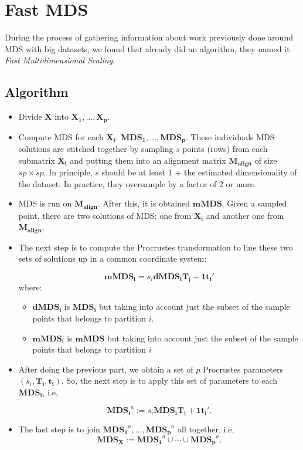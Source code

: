 \documentclass[11pt]{report}
\begin{document}
\section{Fast MDS}
During the process of gathering information about work previously done around
MDS with big datasets, we found that  already did an 
algorithm, they named it \textit{Fast Multidimensional Scaling}. 


\subsection{Algorithm}

\begin{itemize}

\item Divide \textbf{X} into $\mathbf{X_1},\dots, \mathbf{X_p}$.

\item Compute MDS for each $\mathbf{X_i}$: 
$\mathbf{MDS_1}, \dots, \mathbf{MDS_p}$. These individuals MDS solutions are 
stitched together by sampling $s$ points (rows) from each submatrix 
$\mathbf{X_i}$ and putting them into an alignment matrix 
$\mathbf{M_{align}}$ of size $sp \times sp$. In principle, $s$ should be at 
least 1 + the estimated dimensionality of the dataset. In practice, they 
oversample by a factor of 2 or more. 

\item MDS is run on $\mathbf{M_{align}}$. After this, it is obtained
$\mathbf{mMDS}$. Given a sampled point, there are two solutions of MDS: 
one from $\mathbf{X_i}$ and another one from $\mathbf{M_{align}}$.

\item The next step is to compute the Procrustes transformation to  line  
these two sets of solutions up in a common coordinate system:

\[
\mathbf{mMDS_i} = s_i \mathbf{dMDS_i} \mathbf{T_i} + \mathbf{1t_i}'
\]
where:

\begin{itemize}

\item $\mathbf{dMDS_i}$ is $\mathbf{MDS_i}$ but taking into account just
the subset of the sample points that belongs to partition $i$.

\item $\mathbf{mMDS_i}$ is $\mathbf{mMDS}$ but taking into account just
the subset of the sample points that belongs to partition $i$
\end{itemize}

\item After doing the previous part, we obtain a set of $p$ Procrustes 
parameters $(s_i, \mathbf{T_i},  \mathbf{t_i})$. So, the next step is to 
apply this set of parameters to each $\mathbf{MDS_i}$, i.e, 

\[
\mathbf{MDS_i}^a := s_i \mathbf{MDS_i} \mathbf{T_i} + \mathbf{1t_i'}.
\]

\item The last step is to join $\mathbf{MDS_1}^a, \dots,  \mathbf{MDS_p}^a$ 
all together, i.e, 
\[
\mathbf{MDS_X}:= \mathbf{MDS_1}^a \cup \cdots \cup \mathbf{MDS_p}^a.
\]

\end{itemize}
\end{document}
